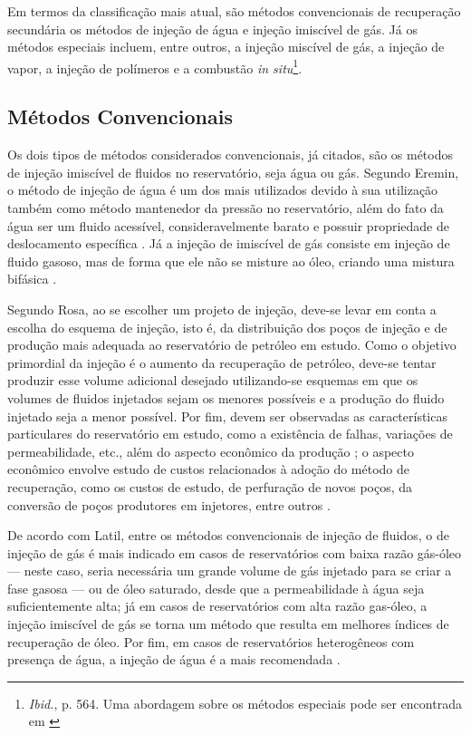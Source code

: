 Em termos da classificação mais atual, são métodos convencionais de recuperação secundária os métodos de injeção de água e injeção imiscível de gás. Já os métodos especiais incluem, entre outros, a injeção miscível de gás, a injeção de vapor, a injeção de polímeros e a combustão \textit{in situ}\footnote{\textit{Ibid.}, p. 564. Uma abordagem sobre os métodos especiais pode ser encontrada em \cite[pp. 677-726]{engres}}.

\subsection{Métodos Convencionais}
Os dois tipos de métodos considerados convencionais, já citados, são os métodos de injeção imiscível de fluidos no reservatório, seja água ou gás. Segundo Eremin, o método de injeção de água é um dos mais utilizados devido à sua utilização também como método mantenedor da pressão no reservatório, além do fato da água ser um fluido acessível, consideravelmente barato e possuir propriedade de deslocamento específica \cite{eremin}. Já a injeção de imiscível de gás consiste em injeção de fluido gasoso, mas de forma que ele não se misture ao óleo, criando uma mistura bifásica \cite[p. 564]{engres}.

Segundo Rosa, ao se escolher um projeto de injeção, deve-se levar em conta a escolha do esquema de injeção, isto é, da distribuição dos poços de injeção e de produção mais adequada ao reservatório de petróleo em estudo. Como o objetivo primordial da injeção é o aumento da recuperação de petróleo, deve-se tentar produzir esse volume adicional desejado utilizando-se esquemas em que os volumes de fluidos injetados sejam os menores possíveis e a produção do fluido injetado seja a menor possível. Por fim, devem ser observadas as características particulares do reservatório em estudo, como a existência de falhas, variações de permeabilidade, etc., além do aspecto econômico da produção \cite[p. 564]{engres}; o aspecto econômico envolve estudo de custos relacionados à adoção do método de recuperação, como os custos de estudo, de perfuração de novos poços, da conversão de poços produtores em injetores, entre outros \cite{latil}.

De acordo com Latil, entre os métodos convencionais de injeção de fluidos, o de injeção de gás é mais indicado em casos de reservatórios com baixa razão gás-óleo --- neste caso, seria necessária um grande volume de gás injetado para se criar a fase gasosa --- ou de óleo saturado, desde que a permeabilidade à água seja suficientemente alta; já em casos de reservatórios com alta razão gas-óleo, a injeção imiscível de gás se torna um método que resulta em melhores índices de recuperação de óleo. Por fim, em casos de reservatórios heterogêneos com presença de água, a injeção de água é a mais recomendada \cite{latil}. 

